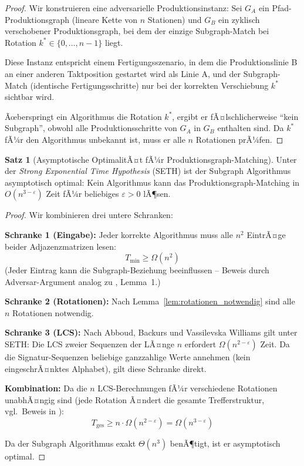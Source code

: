 ﻿\documentclass[a4paper,12pt]{article}
\theoremstyle{definition}
\newtheorem{satz}{Satz}
\begin{document}
\begin{proof}
Wir konstruieren eine adversarielle Produktionsinstanz: Sei $G_A$ ein Pfad-Produktionsgraph
(lineare Kette von $n$ Stationen) und $G_B$ ein zyklisch verschobener Produktionsgraph,
bei dem der einzige Subgraph-Match bei Rotation $k^* \in \{0,\ldots,n-1\}$ liegt.

Diese Instanz entspricht einem Fertigungsszenario, in dem die Produktionslinie B an einer
anderen Taktposition gestartet wird als Linie A, und der Subgraph-Match (identische
Fertigungsschritte) nur bei der korrekten Verschiebung $k^*$ sichtbar wird.

Ãœberspringt ein Algorithmus die Rotation $k^*$, ergibt er fÃ¤lschlicherweise ``kein Subgraph'',
obwohl alle Produktionsschritte von $G_A$ in $G_B$ enthalten sind. Da $k^*$ fÃ¼r den
Algorithmus unbekannt ist, muss er alle $n$ Rotationen prÃ¼fen.
\end{proof}

\begin{satz}[Asymptotische OptimalitÃ¤t fÃ¼r Produktionsgraph-Matching]
\label{satz:optimalitaet}
Unter der \emph{Strong Exponential Time Hypothesis} (SETH) ist der Subgraph Algorithmus
asymptotisch optimal: Kein Algorithmus kann das Produktionsgraph-Matching in $O(n^{3-\varepsilon})$
Zeit fÃ¼r beliebiges $\varepsilon > 0$ lÃ¶sen.
\end{satz}

\begin{proof}
Wir kombinieren drei untere Schranken:

\textbf{Schranke 1 (Eingabe):} Jeder korrekte Algorithmus muss alle $n^2$ EintrÃ¤ge
beider Adjazenzmatrizen lesen:
\[
T_{\text{min}} \geq \Omega(n^2)
\]
(Jeder Eintrag kann die Subgraph-Beziehung beeinflussen -- Beweis durch Adversar-Argument
analog zu \cite{epp2026}, Lemma~1.)

\textbf{Schranke 2 (Rotationen):} Nach Lemma~\ref{lem:rotationen_notwendig} sind alle $n$
Rotationen notwendig.

\textbf{Schranke 3 (LCS):} Nach Abboud, Backurs und Vassilevska Williams \cite{abboud2015lcs}
gilt unter SETH: Die LCS zweier Sequenzen der LÃ¤nge $n$ erfordert $\Omega(n^{2-\varepsilon})$ Zeit.
Da die Signatur-Sequenzen beliebige ganzzahlige Werte annehmen (kein eingeschrÃ¤nktes Alphabet),
gilt diese Schranke direkt.

\textbf{Kombination:} Da die $n$ LCS-Berechnungen fÃ¼r verschiedene Rotationen unabhÃ¤ngig
sind (jede Rotation Ã¤ndert die gesamte Trefferstruktur, vgl.\ Beweis in \cite{epp2026}):
\[
T_{\text{ges}} \geq n \cdot \Omega(n^{2-\varepsilon}) = \Omega(n^{3-\varepsilon})
\]

Da der Subgraph Algorithmus exakt $\Theta(n^3)$ benÃ¶tigt, ist er asymptotisch optimal.
\end{proof}
\end{document}
